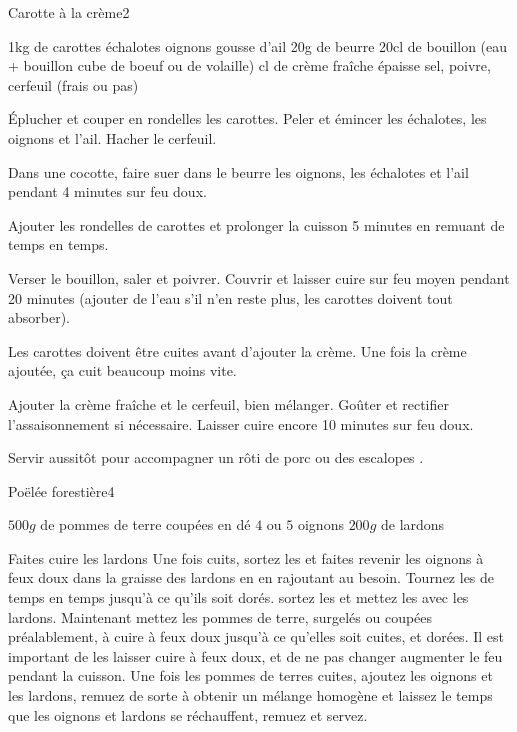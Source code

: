 \begin{recette}{Carotte à la crème}{2}{}{}
\begin{ingredients}
\ingredient 1kg de carottes
 échalotes
 oignons
 gousse d'ail
\ingredient 20g de beurre
\ingredient 20cl de bouillon (eau + bouillon cube de boeuf ou de volaille)
 cl de crème fraîche épaisse
\ingredient sel, poivre, cerfeuil (frais ou pas)
\end{ingredients}

\begin{preparation}
\etape Éplucher et couper en rondelles les carottes. Peler et émincer les échalotes, les oignons et l’ail. Hacher le cerfeuil.

\etape Dans une cocotte, faire suer dans le beurre les oignons, les échalotes et l’ail pendant 4 minutes sur feu doux.

\etape Ajouter les rondelles de carottes et prolonger la cuisson 5 minutes en remuant de temps en temps.

\etape Verser le bouillon, saler et poivrer. Couvrir et laisser cuire sur feu moyen pendant 20 minutes (ajouter de l'eau s'il n'en reste plus, les carottes doivent tout absorber).

\begin{remarque}
Les carottes doivent être cuites avant d'ajouter la crème. Une fois la crème ajoutée, ça cuit beaucoup moins vite.
\end{remarque}

\etape Ajouter la crème fraîche et le cerfeuil, bien mélanger. Goûter et rectifier l’assaisonnement si nécessaire. Laisser cuire encore 10 minutes sur feu doux.

\etape Servir aussitôt pour accompagner un rôti de porc ou des escalopes .
\end{preparation}

\end{recette}

\begin{recette}{Poëlée forestière}{4}{}{}
\begin{ingredients}
\ingredient $500\unit{g}$ de pommes de terre coupées en dé
\ingredient $4$ ou $5$ oignons
\ingredient $200\unit{g}$ de lardons
\end{ingredients}

\begin{preparation}
\etape Faites cuire les lardons
\etape Une fois cuits, sortez les et faites revenir les oignons à feux doux dans la graisse des lardons en en rajoutant au besoin. Tournez les de temps en temps jusqu'à ce qu'ils soit dorés.
\etape sortez les et mettez les avec les lardons. Maintenant mettez les pommes de terre, surgelés ou coupées préalablement, à cuire à feux doux jusqu'à ce qu'elles soit cuites, et dorées. Il est important de les laisser cuire à feux doux, et de ne pas changer augmenter le feu pendant la cuisson.
\etape Une fois les pommes de terres cuites, ajoutez les oignons et les lardons, remuez de sorte à obtenir un mélange homogène et laissez le temps que les oignons et lardons se réchauffent, remuez et servez.
\end{preparation}

\end{recette}

